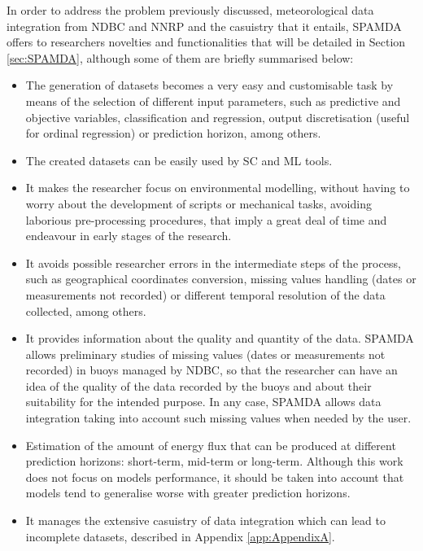 \documentclass[energies,article,submit,moreauthors,pdftex]{Definitions/mdpi}
\begin{document}
		In order to address the problem previously discussed, meteorological data integration from NDBC and NNRP and the casuistry that it entails, SPAMDA offers to researchers novelties and functionalities that will be detailed in Section \ref{sec:SPAMDA}, although some of them are briefly summarised below:

		\begin{itemize}
			\item The generation of datasets becomes a very easy and customisable task by means of the selection of different input parameters, such as predictive and objective variables, classification and regression, output discretisation (useful for ordinal regression) or prediction horizon, among others.
			
			\item The created datasets can be easily used by SC and ML tools. 
			
			\item It makes the researcher focus on environmental modelling, without having to worry about the development of scripts or mechanical tasks, avoiding laborious pre-processing procedures, that imply a great deal of time and endeavour in early stages of the research.
			
			\item It avoids possible researcher errors in the intermediate steps of the process, such as geographical coordinates conversion, missing values handling (dates or measurements not recorded) or different temporal resolution of the data collected, among others.
			
			\item It provides information about the quality and quantity of the data. SPAMDA allows preliminary studies of missing values (dates or measurements not recorded) in buoys managed by NDBC, so that the researcher can have an idea of the quality of the data recorded by the buoys and about their suitability for the intended purpose. In any case, SPAMDA allows data integration taking into account such missing values when needed by the user.
			
			\item Estimation of the amount of energy flux that can be produced at different prediction horizons: short-term, mid-term or long-term. Although this work does not focus on models performance, it should be taken into account that models tend to generalise worse with greater prediction horizons.
						
			\item It manages the extensive casuistry of data integration which can lead to incomplete datasets, described in Appendix \ref{app:AppendixA}.
			

\end{itemize}
\end{document}
